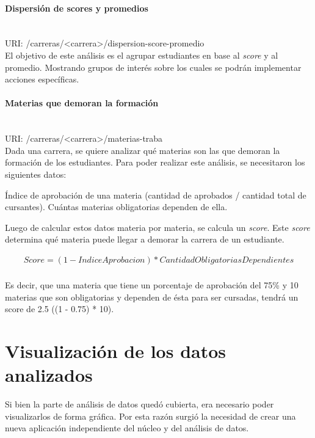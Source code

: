 \paragraph{Dispersión de scores y promedios}\mbox{}\\
URI: /carreras/<carrera>/dispersion-score-promedio \\

El objetivo de este análisis es el agrupar estudiantes en base al \textit{score} y al promedio. Mostrando grupos de interés sobre los cuales se podrán implementar acciones específicas.

\paragraph{Materias que demoran la formación}\mbox{}\\

URI: /carreras/<carrera>/materias-traba \\

Dada una carrera, se quiere analizar qué materias son las que demoran la formación de los estudiantes. 
Para poder realizar este análisis, se necesitaron los siguientes datos:
\begin{outline}
\1 Índice de aprobación de una materia (cantidad de aprobados / cantidad total de cursantes).
\1 Cuántas materias obligatorias dependen de ella.
\end{outline}

Luego de calcular estos datos materia por materia, se calcula un \textit{score}. Este \textit{score} determina qué materia puede llegar a demorar la carrera de un estudiante.

\begin{align*}
  Score = (1 - IndiceAprobacion) * CantidadObligatoriasDependientes\\
\end{align*}

Es decir, que una materia que tiene un porcentaje de aprobación del 75\% y 10 materias que son obligatorias y dependen de ésta para ser cursadas, tendrá un score de 2.5 ((1 - 0.75) * 10).



\section[Visualización de los datos analizados]{Visualización de los datos analizados}

Si bien la parte de análisis de datos quedó cubierta, era necesario poder visualizarlos de forma gráfica. Por esta razón surgió la necesidad de crear una nueva aplicación independiente del núcleo y del análisis de datos.

